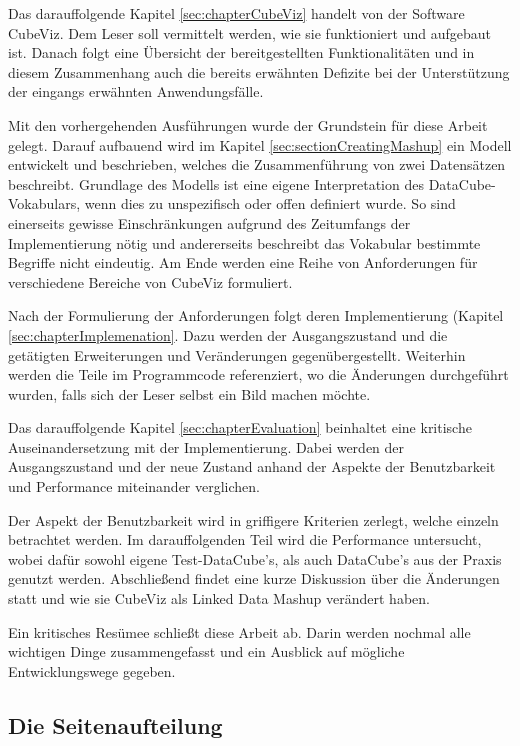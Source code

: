 \documentclass[11pt]{article}
\begin{document}
Das darauffolgende Kapitel \ref{sec:chapterCubeViz} handelt von der Software CubeViz. Dem Leser soll vermittelt werden, wie sie funktioniert und aufgebaut ist. Danach folgt eine Übersicht der bereitgestellten Funktionalitäten und in diesem Zusammenhang auch die bereits erwähnten Defizite bei der Unterstützung der eingangs erwähnten Anwendungsfälle. 

Mit den vorhergehenden Ausführungen wurde der Grundstein für diese Arbeit gelegt. Darauf aufbauend wird im Kapitel \ref{sec:sectionCreatingMashup} ein Modell entwickelt und beschrieben, welches die Zusammenführung von zwei Datensätzen beschreibt. Grundlage des Modells ist eine \vbox{eigene} Interpretation des DataCube-Vokabulars, wenn dies zu unspezifisch oder offen definiert wurde. So sind einerseits gewisse Einschränkungen aufgrund des Zeitumfangs der Implementierung nötig und andererseits beschreibt das Vokabular bestimmte Begriffe nicht eindeutig. Am Ende werden eine Reihe von Anforderungen für verschiedene Bereiche von CubeViz formuliert. 

Nach der Formulierung der Anforderungen folgt deren Implementierung (Kapitel \ref{sec:chapterImplemenation}. Dazu werden der Ausgangszustand und die getätigten Erweiterungen und Veränderungen gegenübergestellt. Weiterhin werden die Teile im Programmcode referenziert, wo die Änderungen durchgeführt wurden, falls sich der Leser selbst ein Bild machen möchte. 

Das darauffolgende Kapitel \ref{sec:chapterEvaluation} beinhaltet eine kritische Auseinandersetzung mit der Implementierung. Dabei werden der Ausgangszustand und der neue Zustand anhand der Aspekte der Benutzbarkeit und Performance miteinander verglichen. 

\newpage
\noindent
Der Aspekt der Benutzbarkeit wird in griffigere Kriterien zerlegt, welche einzeln betrachtet werden. Im darauffolgenden Teil wird die Performance untersucht, wobei dafür sowohl eigene Test-DataCube's, als auch DataCube's aus der Praxis genutzt werden. Abschließend findet eine kurze Diskussion über die Änderungen statt und wie sie CubeViz als Linked Data Mashup verändert haben.

Ein kritisches Resümee schließt diese Arbeit ab. Darin werden nochmal alle wichtigen Dinge zusammengefasst und ein Ausblick auf mögliche Entwicklungswege gegeben.


%
%
\subsection{Die Seitenaufteilung}
\end{document}
